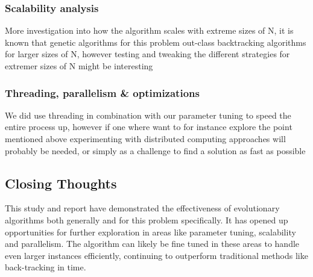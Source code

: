 \subsubsection{Scalability analysis}
More investigation into how the algorithm scales with extreme sizes of N, it is known that genetic algorithms for this problem out-class backtracking algorithms for larger sizes of N, however testing and tweaking the different strategies for extremer sizes of N might be interesting
\subsubsection{Threading, parallelism \& optimizations}
We did use threading in combination with our parameter tuning to speed the entire process up, however if one where want to for instance explore the point mentioned above experimenting with distributed computing approaches will probably be needed, or simply as a challenge to find a solution as fast as possible
\subsection{Closing Thoughts}
This study and report have demonstrated the effectiveness of evolutionary algorithms both generally and for this problem specifically. It has opened up opportunities for further exploration in areas like parameter tuning, scalability and parallelism. The algorithm can likely be fine tuned in these areas to handle even larger instances efficiently, continuing to outperform traditional methods like back-tracking in time.